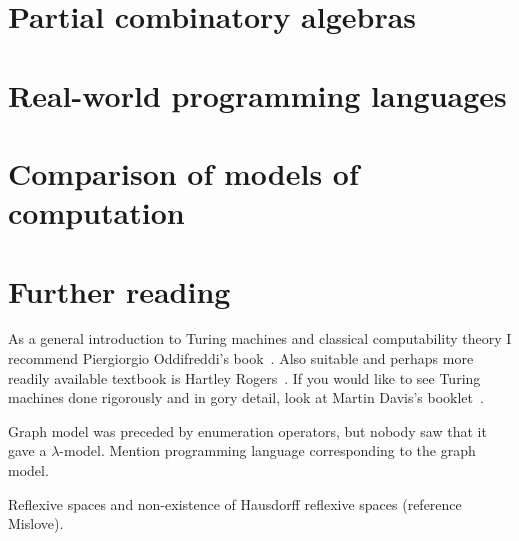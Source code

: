 \section{Partial combinatory algebras}
\label{sec:pcas}


\section{Real-world programming languages}
\label{sec:programming-languages}


\section{Comparison of models of computation}
\label{sec:models-comparison}



\section{Further reading}
\label{sec:models-further-reading}

As a general introduction to Turing machines and classical
computability theory I recommend Piergiorgio Oddifreddi's
book~\cite{Oddifreddi}. Also suitable and perhaps more readily
available textbook is Hartley Rogers~\cite{Rogers}. If you would like
to see Turing machines done rigorously and in gory detail, look at
Martin Davis's booklet~\cite{Davis}.


Graph model was preceded by enumeration operators, but nobody saw that
it gave a $\lambda$-model. Mention programming language corresponding
to the graph model.

Reflexive spaces and non-existence of Hausdorff reflexive spaces
(reference Mislove).


